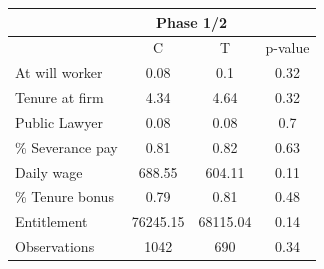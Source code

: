 \begin{tabular}{lccc}
\toprule
      & \multicolumn{2}{c}{Phase 1/2} &  \\
\midrule
\midrule
      & C     & T     & p-value \\
\midrule
\midrule
At will worker & 0.08  & 0.1   & 0.32 \\
Tenure at firm & 4.34  & 4.64  & 0.32 \\
Public Lawyer & 0.08  & 0.08  & 0.7 \\
\% Severance pay & 0.81  & 0.82  & 0.63 \\
Daily wage & 688.55 & 604.11 & 0.11 \\
\% Tenure bonus & 0.79  & 0.81  & 0.48 \\
Entitlement & 76245.15 & 68115.04 & 0.14 \\
\midrule
\midrule
Observations & 1042  & 690   & 0.34 \\
\bottomrule
\end{tabular}%
